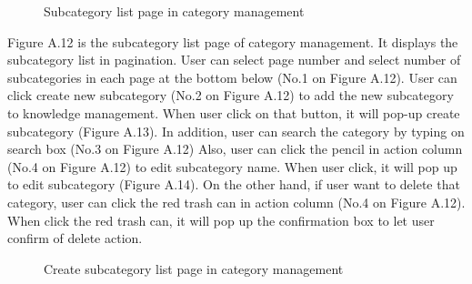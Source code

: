 \documentclass[12pt,oneside,openright,a4paper]{cpe-english-project}
\begin{document}
\pagebreak
{} 
\begin{figure}[!h]\centering
{}
\caption{Subcategory list page in category management}
\label{fig:Subcategory list page in category management}
\end{figure}

Figure A.12 is the subcategory list page of category management. It displays the 
subcategory list in pagination. User can select page number and select number of 
subcategories in each page at the bottom below (No.1 on Figure A.12).
User can click create new subcategory (No.2 on Figure A.12) to add the new 
subcategory to knowledge management. When user click on that button, it will pop-up create 
subcategory (Figure A.13). In addition, user can search the category by typing on search box 
(No.3 on Figure A.12)
Also, user can click the pencil in action column (No.4 on Figure A.12) to edit 
subcategory name. When user click, it will pop up to edit subcategory (Figure A.14). On the 
other hand, if user want to delete that category, user can click the red trash can in action 
column (No.4 on Figure A.12). When click the red trash can, it will pop up the confirmation 
box to let user confirm of delete action.

\begin{figure}[!h]\centering
{}
\caption{Create subcategory list page in category management}
\label{fig:Create subcategory list page in category management}
\end{figure}
\end{document}

